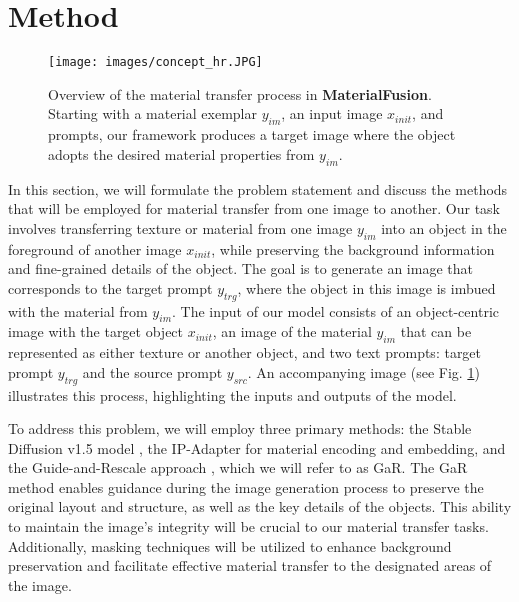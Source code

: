 \section{Method}
\label{sec:method}



\begin{figure}[t]
  \centering
   \vspace{-15pt}
   \texttt{[image: images/concept\_hr.JPG]}

   \caption{Overview of the material transfer process in \textbf{MaterialFusion}. Starting with a material exemplar $y_{im}$, an input image $x_{init}$, and prompts, our framework produces a target image where the object adopts the desired material properties from $y_{im}$.}
   \label{fig:concept}

   \vspace{-5pt}
\end{figure}
In this section, we will formulate the problem statement and discuss the methods that will be employed for material transfer from one image to another. Our task involves transferring texture or material from one image $y_{im}$ into an object in the foreground of another image $x_{init}$, while preserving the background information and fine-grained details of the object. The goal is to generate an image that corresponds to the target prompt $y_{trg}$, where the object in this image is imbued with the material from $y_{im}$. The input of our model consists of an object-centric image with the target object $x_{init}$, an image of the material $y_{im}$ that can be represented as either texture or another object, and two text prompts: target prompt $y_{trg}$ and the source prompt $y_{src}$.
An accompanying image (see Fig. \ref{fig:concept}) illustrates this process, highlighting the inputs and outputs of the model.

To address this problem, we will employ three primary methods: the Stable Diffusion v1.5 model \cite{rombach2022high}, the IP-Adapter \cite{ye2023ipadaptertextcompatibleimage} for material encoding and embedding, and the Guide-and-Rescale approach \cite{titov2024guideandrescaleselfguidancemechanismeffective}, which we will refer to as GaR. The GaR method enables guidance during the image generation process to preserve the original layout and structure, as well as the key details of the objects. This ability to maintain the image's integrity will be crucial to our material transfer tasks. Additionally, masking techniques will be utilized to enhance background preservation and facilitate effective material transfer to the designated areas of the image.


